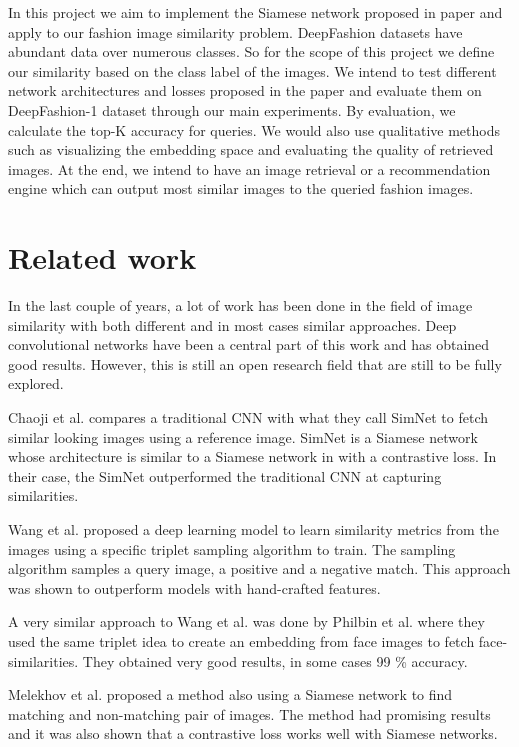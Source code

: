 \documentclass{article}
\begin{document}
In this project we aim to implement the Siamese network proposed in paper \cite{bell2015learning} and apply to our fashion image similarity problem. DeepFashion datasets have abundant data over numerous classes. So for the scope of this project we define our similarity based on the class label of the images. We intend to test different network architectures and losses proposed in the paper and evaluate them on DeepFashion-1 dataset through our main experiments. By evaluation, we calculate the top-K accuracy for queries. We would also use qualitative methods such as visualizing the embedding space and evaluating the quality of retrieved images. At the end, we intend to have an image retrieval or a recommendation engine which can output most similar images to the queried fashion images.

\section{Related work}\label{related_work}
In the last couple of years, a lot of work has been done in the field of image similarity with both different and in most cases similar approaches. Deep convolutional networks have been a central part of this work and has obtained good results. However, this is still an open research field that are still to be fully explored. 

Chaoji et al.\cite{appalaraju2017image} compares a traditional CNN with what they call SimNet to fetch similar looking images using a reference image. SimNet is a Siamese network whose architecture is similar to a Siamese network in \cite{bell2015learning} with a contrastive loss. In their case, the SimNet outperformed the traditional CNN at capturing similarities. 

Wang et al. \cite{wang2014learning} proposed a deep learning model to learn similarity metrics from the images using a specific triplet sampling algorithm to train. The sampling algorithm samples a query image, a positive and a negative match. This approach was shown to outperform models with hand-crafted features. 

A very similar approach to Wang et al.\cite{wang2014learning} was done by Philbin et al. \cite{schroff2015facenet} where they used the same triplet idea to create an embedding from face images to fetch face-similarities. They obtained very good results, in some cases 99 \% accuracy. 

Melekhov et al. \cite{melekhov2016siamese} proposed a method also using a Siamese network to find matching and non-matching pair of images. The method had promising results and it was also shown that a contrastive loss works well with Siamese networks.
\end{document}
